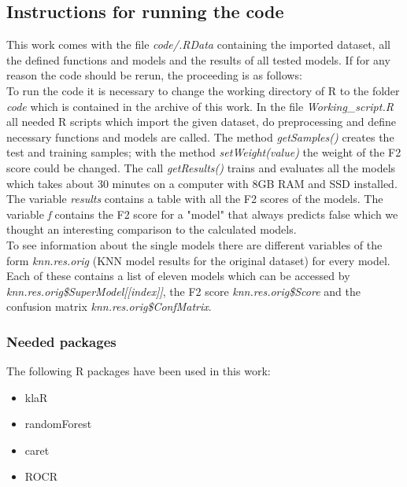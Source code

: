\subsection{Instructions for running the code}

This work comes with the file \textit{code/.RData} containing the imported dataset, all the defined functions and models and the results of all tested models. 
If for any reason the code should be rerun, the proceeding is as follows:\\
To run the code it is necessary to change the working directory of R to the folder \textit{code} which is contained in the archive of this work. In the file \textit{Working\_script.R} all needed R scripts which import the given dataset, do preprocessing and define necessary functions and models are called. The method \textit{getSamples()} creates the test and training samples; with the method \textit{setWeight(value)} the weight of the F2 score could be changed. The call \textit{getResults()} trains and evaluates all the models which takes about 30 minutes on a computer with 8GB RAM and SSD installed. The variable \textit{results} contains a table with all the F2 scores of the models. The variable \textit{f} contains the F2 score for a "model" that always predicts false which we thought an interesting comparison to the calculated models.\\
To see information about the single models there are different variables of the form \textit{knn.res.orig} (KNN model results for the original dataset) for every model. Each of these contains a list of eleven models which can be accessed by \textit{knn.res.orig\$SuperModel[[index]]}, the F2 score \textit{knn.res.orig\$Score} and the confusion matrix \textit{knn.res.orig\$ConfMatrix}.

\subsubsection{Needed packages}

The following R packages have been used in this work:

\begin{itemize}
\item{klaR}
\item{randomForest}
\item{caret}
\item{ROCR}
\end{itemize}